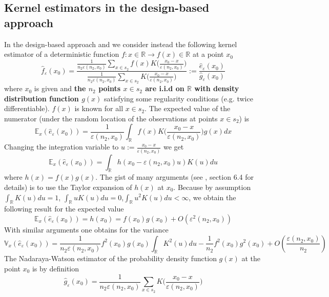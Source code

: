 \documentclass[a4paper,12pt,leqno, titlepage]{article}
\newcommand{\EX}{\mathbb{E}}
\newcommand{\VAR}{\mathbb{V}}
\newcommand{\R}{\mathbb{R}}
\begin{document}
\begin{appendix}
\section{Kernel estimators in the design-based approach}\label{appendixdesignbased}
In the design-based approach and we consider instead the following kernel estimator of a deterministic function  $f:x\in{\R}\rightarrow f(x)\in{\R}$ at a point $x_0$
\begin{equation}\label{kerneldetermfofx}
\hat{f}_{\varepsilon}(x_0)=\frac{\frac{1}{n_2\varepsilon(n_2,x_0)}\sum_{x\in{s_2}}f(x)K\big(\frac{x_0-x}{\varepsilon(n_2,x_0)}\big)}
{\frac{1}{n_2\varepsilon(n_2,x_0)}\sum_{x\in{s_2}}K\big(\frac{x_0-x}{\varepsilon(n_2,x_0)}\big)}
:=\frac{\hat{e}_{\varepsilon}(x_0)}{\hat{g}_{\varepsilon}(x_0)}
\end{equation}
where $x_0$ is given and \textbf{the $n_2$ points $x\in{s_2}$ are i.i.d on $\R$ with density distribution function $g(x)$} satisfying some regularity conditions (e.g. twice differentiable). $f(x)$ is known for all $x\in{s_2}$. The expected value of the numerator (under the random location of the observations at points $x\in{s_2}$) is
$$\EX_x(\hat{e}_{\varepsilon}(x_0))=
\frac{1}{\varepsilon(n_2,x_0)}\int_{\R}f(x)K\big(\frac{x_0-x}{\varepsilon(n_2,x_0)}\big)g(x)dx$$
Changing the integration variable to $u:=\frac{x_0-x}{\varepsilon(n_2,x_0)}$ we get
$$\EX_x(\hat{e}_{\varepsilon}(x_0))=\int_{\R}h(x_0-\varepsilon(n_2,x_0)u)K(u)du$$
where $h(x)=f(x)g(x)$. The gist of many arguments (see \cite{lehmann}, section 6.4 for details) is to use the Taylor expansion of $h(x)$ at $x_0$. Because by assumption $\int_{\R}K(u)du=1$, $\int_ {\R}uK(u)du=0$,$\int_{\R}u^2K(u)du<\infty$, we obtain the following result for the expected value
 \begin{equation}\label{nadaraya1}
\EX_x(\hat{e}_{\varepsilon}(x_0))=h(x_0)=f(x_0)g(x_0)+ O(\varepsilon^2(n_2,x_0))
\end{equation}
With similar arguments one obtains for the variance
\begin{equation}\label{nadaraya2}
\VAR_x(\hat{e}_{\varepsilon}(x_0))=\frac{1}{n_2\varepsilon(n_2,x_0)}f^2(x_0)g(x_0)\int_{\R}K^2(u)du
-\frac{1}{n_2}f^2(x_0)g^2(x_0)+O(\frac{\varepsilon(n_2,x_0)}{n_2})
\end{equation}
The Nadaraya-Watson estimator of the probability density function $g(x)$ at the point $x_0$ is by definition
\begin{equation}\label{nadaraya3}
\hat{g}_{\varepsilon}(x_0)=\frac{1}{n_2\varepsilon(n_2,x_0)}\sum_{x\in{s_2}}K\big(\frac{x_0-x}{\varepsilon(n_2,x_0)}\big)

\end{equation}
\end{appendix}
\end{document}

